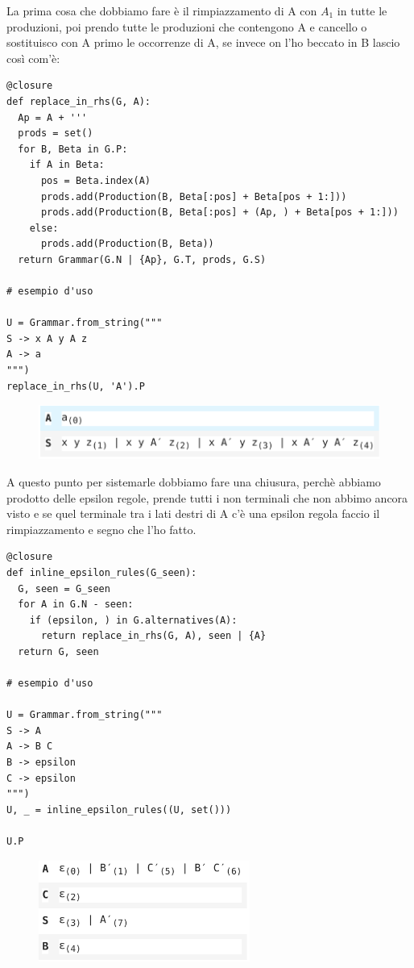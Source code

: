 La prima cosa che dobbiamo fare è il rimpiazzamento di A con $A_1$ in tutte le produzioni, poi prendo tutte le produzioni che contengono A e cancello o sostituisco con A primo le occorrenze di A, se invece on l'ho beccato in B lascio così com'è:
\begin{lstlisting}
@closure
def replace_in_rhs(G, A):
  Ap = A + '''
  prods = set()
  for B, Beta in G.P:
    if A in Beta:
      pos = Beta.index(A)
      prods.add(Production(B, Beta[:pos] + Beta[pos + 1:]))
      prods.add(Production(B, Beta[:pos] + (Ap, ) + Beta[pos + 1:]))
    else:
      prods.add(Production(B, Beta))
  return Grammar(G.N | {Ap}, G.T, prods, G.S)

# esempio d'uso

U = Grammar.from_string("""
S -> x A y A z
A -> a
""")
replace_in_rhs(U, 'A').P
\end{lstlisting}

\begin{figure}[ht!]
  \centering
  \includegraphics[scale=1]{images/Parsing/esReplace.png}
\end{figure}

A questo punto per sistemarle dobbiamo fare una chiusura, perchè abbiamo prodotto delle epsilon regole, prende tutti i non terminali che non abbimo ancora visto e se quel terminale tra i lati destri di A c'è una epsilon regola faccio il rimpiazzamento e segno che l'ho fatto.
\begin{lstlisting}
@closure
def inline_epsilon_rules(G_seen):
  G, seen = G_seen
  for A in G.N - seen:
    if (epsilon, ) in G.alternatives(A):
      return replace_in_rhs(G, A), seen | {A}
  return G, seen

# esempio d'uso

U = Grammar.from_string("""
S -> A
A -> B C
B -> epsilon
C -> epsilon
""")
U, _ = inline_epsilon_rules((U, set()))

U.P
\end{lstlisting}

\begin{figure}[ht!]
  \centering
  \includegraphics[scale=1]{images/Parsing/esInline.png}
\end{figure}

